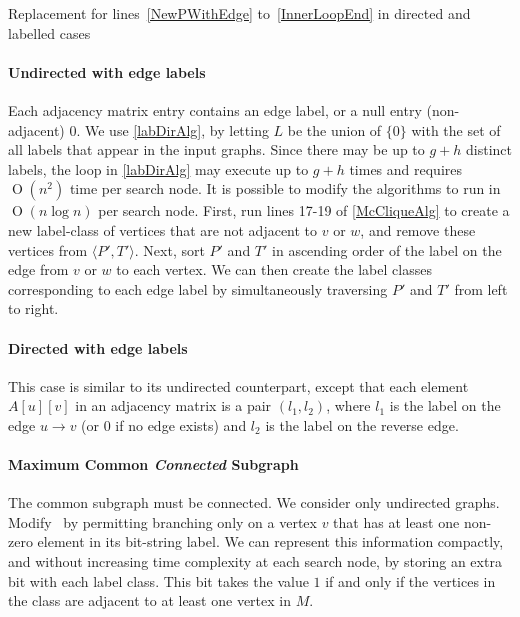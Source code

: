 \documentclass[letterpaper]{article}
\newcommand{\McSplit}{\textproc{McSplit}}
\newcommand{\linerangeref}[2]{lines~\ref{#1} to~\ref{#2}}
\newcommand{\BigO}[1]{\ensuremath{\operatorname{O}\left(#1\right)}}
\begin{document}
\begin{algorithm}
\DontPrintSemicolon
\nl    {}
\caption{Replacement for \linerangeref{NewPWithEdge}{InnerLoopEnd} in directed and labelled cases}
\label{labDirAlg}
\end{algorithm}

\paragraph{Undirected with edge labels} Each adjacency matrix
entry contains an edge label, or a null entry (non-adjacent) $0$.
We use \cref{labDirAlg}, by letting $L$ be
the union of $\{0\}$ with the set of all labels that appear in the input
graphs. Since there may be up to $g + h$ distinct labels, the loop in
\cref{labDirAlg} may execute up to $g + h$ times and
requires $\BigO{n^2}$ time per search
node.  It is possible to modify the algorithms to run in $\BigO{n \log n}$ per
search node.  First, run lines 17-19
of \cref{McCliqueAlg} to create a new label-class of vertices that are not
adjacent to $v$ or $w$, and remove these vertices from $\langle P',T' \rangle$.
Next, sort $P'$ and $T'$ in ascending order of the label on the edge from $v$
or $w$ to each vertex. We can then create the label classes corresponding to
each edge label by simultaneously traversing $P'$ and $T'$ from left to right.

\paragraph{Directed with edge labels} This case is similar to its undirected
counterpart, except that each element $A[u][v]$ in an adjacency matrix is a
pair $(l_1, l_2)$, where $l_1$ is the label on the edge $u \rightarrow v$ (or 0
if no edge exists) and $l_2$ is the label on the reverse edge.

\paragraph{Maximum Common \emph{Connected} Subgraph} The common subgraph must
be connected. We consider only undirected graphs.  Modify \McSplit\ by
permitting branching only on a vertex $v$ that has at least one non-zero
element in its bit-string label.  We can represent this information compactly,
and without increasing time complexity at each search node, by storing an extra
bit with each label class.  This bit takes the value $1$ if and only if the vertices in
the class are adjacent to at least one vertex in $M$.
\end{document}
